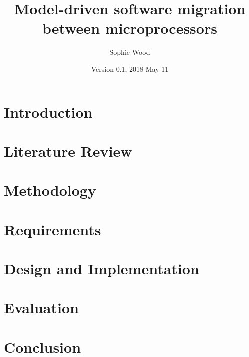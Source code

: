 \documentclass{UoYCSproject}
\author{Sophie Wood}
\title{Model-driven software migration between microprocessors}
\date{Version 0.1, 2018-May-11}
\begin{document}
\maketitle

\chapter{Introduction}

\chapter{Literature Review}

\chapter{Methodology}

\chapter{Requirements}

\chapter{Design and Implementation}

\chapter{Evaluation}

\chapter{Conclusion}
\end{document}
